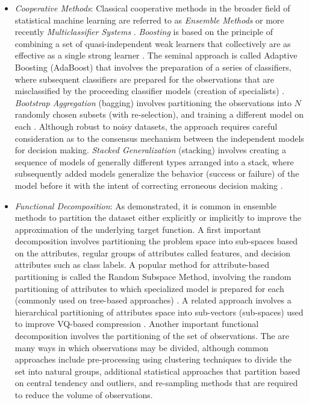 \documentclass[a4paper, 11pt]{article}
\begin{document}
\begin{itemize}
	\item \emph{Cooperative Methods}: Classical cooperative methods in the broader field of statistical machine learning are referred to as \emph{Ensemble Methods} \cite{Opitz1999, Polikar2006} or more recently \emph{Multiclassifier Systems} \cite{Ghosh2002}. \emph{Boosting} is based on the principle of combining a set of quasi-independent weak learners that collectively are as effective as a single strong learner \cite{Kearns1988, Schapire1992}. The seminal approach is called Adaptive Boosting (AdaBoost) that involves the preparation of a series of classifiers, where subsequent classifiers are prepared for the observations that are misclassified by the proceeding classifier models (creation of specialists) \cite{Schapire2003}. \emph{Bootstrap Aggregation} (bagging) involves partitioning the observations into $N$ randomly chosen subsets (with re-selection), and training a different model on each \cite{Breiman1996}. Although robust to noisy datasets, the approach requires careful consideration as to the consensus mechanism between the independent models for decision making. \emph{Stacked Generalization} (stacking) involves creating a sequence of models of generally different types arranged into a stack, where subsequently added models generalize the behavior (success or failure) of the model before it with the intent of correcting erroneous decision making \cite{Wolpert1992, Ting1999}. 
	
	\item \emph{Functional Decomposition}: As demonstrated, it is common in ensemble methods to partition the dataset either explicitly or implicitly to improve the approximation of the underlying target function. A first important decomposition involves partitioning the problem space into sub-spaces based on the attributes, regular groups of attributes called features, and decision attributes such as class labels. A popular method for attribute-based partitioning is called the Random Subspace Method, involving the random partitioning of attributes to which specialized model is prepared for each (commonly used on tree-based approaches) \cite{Ho1998}. A related approach involves a hierarchical partitioning of attributes space into sub-vectors (sub-spaces) used to improve VQ-based compression \cite{Gersho1984}. Another important functional decomposition involves the partitioning of the set of observations. The are many ways in which observations may be divided, although common approaches include pre-processing using clustering techniques to divide the set into natural groups, additional statistical approaches that partition based on central tendency and outliers, and re-sampling methods that are required to reduce the volume of observations.
	

\end{itemize}
\end{document}
